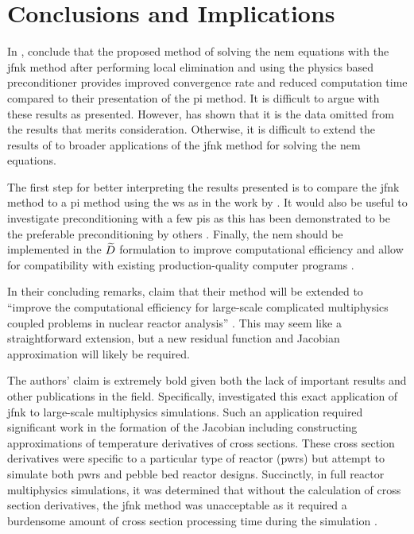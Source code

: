 \section{Conclusions and Implications}
\label{sec:conclusion}

  In , \citeauthor{qe2paper} conclude that the proposed
  method of solving the \gls{nem} equations with the \gls{jfnk} method after
  performing local elimination and using the physics based preconditioner
  provides improved convergence rate and reduced computation time compared to
  their presentation of the \gls{pi} method. It is difficult to argue with these
  results as presented. However,  has shown that it is the
  data omitted from the results that merits consideration. Otherwise, it is
  difficult to extend the results of \citeauthor{qe2paper} to broader
  applications of the \gls{jfnk} method for solving the \gls{nem} equations.

  The first step for better interpreting the results presented is to compare the
  \gls{jfnk} method to a \gls{pi} method using the \gls{ws} as in the work by
  \citeauthor{jfnk_wielandt}. It would also be useful to investigate
  preconditioning with a few \glspl{pi} as this has been demonstrated to be the
  preferable preconditioning by others \cite{gill_azmy,jfnk_wielandt}. Finally,
  the \gls{nem} should be implemented in the $\widetilde{D}$ formulation to improve
  computational efficiency and allow for compatibility with existing
  production-quality computer programs \cite{palmtagThesis,smith_nonlinear}.

  In their concluding remarks, \citeauthor{qe2paper} claim that their method
  will be extended to ``improve the computational efficiency for large-scale
  complicated multiphysics coupled problems in nuclear reactor analysis''
  \cite{qe2paper}. This may seem like a straightforward extension, but a new
  residual function and Jacobian approximation will likely be required.

  The authors' claim is extremely bold given both the lack of important results
  and other publications in the field. Specifically, \citeauthor{caslJFNK}
  investigated this exact application of \gls{jfnk} to large-scale multiphysics
  simulations. Such an application required significant work in the formation of
  the Jacobian including constructing approximations of temperature derivatives
  of cross sections. These cross section derivatives were specific to a
  particular type of reactor (\glspl{pwr}) but \citeauthor{qe2paper} attempt to
  simulate both \glspl{pwr} and pebble bed reactor designs. Succinctly, in
  full reactor multiphysics simulations, it was determined that without the
  calculation of cross section derivatives, the \gls{jfnk} method was
  unacceptable as it required a burdensome amount of cross section processing 
  time during the simulation \cite{caslJFNK}.


